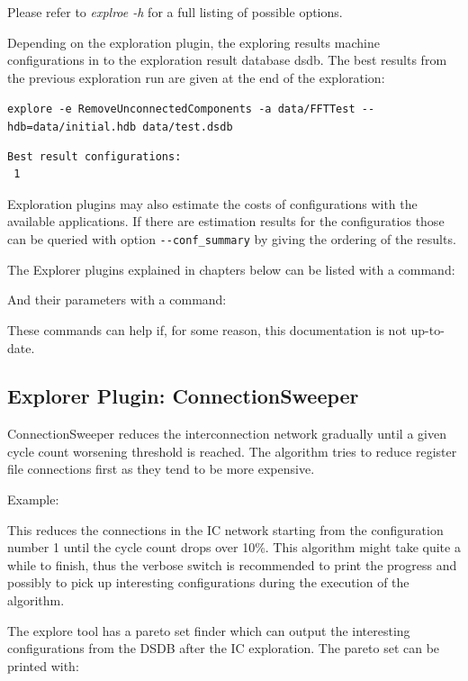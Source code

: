 \documentclass[a4paper,twoside]{tceusermanual}
\begin{document}
Please refer to \textit{explroe -h} for a full listing of possible options.

Depending on the exploration plugin, the exploring results machine
configurations in to the exploration result database dsdb. The best results
from the previous exploration run are given at the end of the exploration:

\verb|explore -e RemoveUnconnectedComponents -a data/FFTTest --hdb=data/initial.hdb data/test.dsdb|

\begin{verbatim}
Best result configurations:
 1
\end{verbatim}
Exploration plugins may also estimate the costs of configurations with the
available applications. If there are estimation results for the configuratios
those can be queried with option \verb|--conf_summary| by giving the
ordering of the results.

The Explorer plugins explained in chapters below can be listed with a command:


And their parameters with a command:


These commands can help if, for some reason, this documentation is not up-to-date.

\subsection{Explorer Plugin: ConnectionSweeper}
\label{ConnectionSweeper}
ConnectionSweeper reduces the interconnection network gradually until a
given cycle count worsening threshold is reached. The algorithm tries to
reduce register file connections first as they tend to be more expensive.

Example:


This reduces the connections in the IC network starting from the configuration 
number 1 until the cycle count drops over 10\%. This algorithm might take 
quite a while to finish, thus the verbose switch is recommended to print 
the progress and possibly to pick up interesting configurations during the 
execution of the algorithm.

The explore tool has a pareto set finder which can output the interesting
configurations from the DSDB after the IC exploration. The pareto set
can be printed with:
\end{document}

